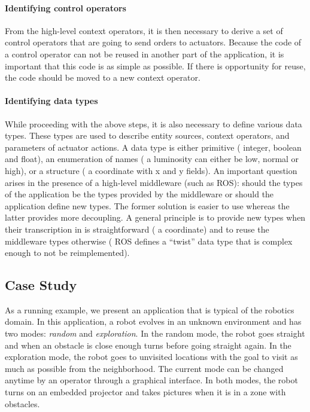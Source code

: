 \paragraph*{Identifying control operators}
From the high-level context operators, it is then necessary to derive
a set of control operators that are going to send orders to actuators.
Because the code of a control operator can not be reused in another
part of the application, it is important that this code is as simple
as possible. If there is opportunity for reuse, the code should be
moved to a new context operator. 

\paragraph*{Identifying data types}
While proceeding with the above steps, it is also necessary to define
various data types. These types are used to describe entity sources,
context operators, and parameters of actuator actions. A data type is
either primitive (\eg{} integer, boolean and float), an enumeration of
names (\eg{} a luminosity can either be low, normal or high), or a
structure (\eg{} a coordinate with x and y fields). An important
question arises in the presence of a high-level middleware (such as
ROS): should the types of the application be the types provided by the
middleware or should the application define new types. The former
solution is easier to use whereas the latter provides more decoupling.
A general principle is to provide new types when their transcription
in \diaspec{} is straightforward (\eg{} a coordinate) and to reuse the
middleware types otherwise (\eg{} ROS defines a ``twist'' data type
that is complex enough to not be reimplemented).

\subsection{Case Study}


As a running example, we present an application that is typical of the
robotics domain. In this application, a robot evolves in an unknown
environment and has two modes: \emph{random} and \emph{exploration}.
In the random mode, the robot goes straight and when an obstacle is
close enough turns before going straight again. In the exploration
mode, the robot goes to unvisited locations with the goal to visit as
much as possible from the neighborhood. The current mode can be
changed anytime by an operator through a graphical interface. In both
modes, the robot turns on an embedded projector and takes pictures
when it is in a zone with obstacles.

